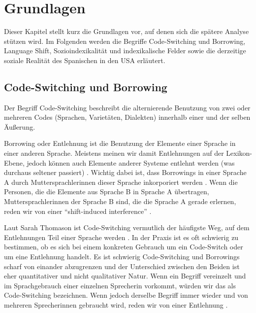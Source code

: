 \section{Grundlagen}


Dieser Kapitel stellt kurz die Grundlagen vor, auf denen sich die spätere Analyse stützen wird.
Im Folgenden werden die Begriffe Code-Switching und Borrowing, Language Shift, %
Sozioindexikalität und indexikalische Felder sowie die derzeitige soziale Realität des Spanischen in den USA erläutert.

\subsection{Code-Switching und Borrowing}
Der Begriff Code-Switching beschreibt die alternierende Benutzung von zwei oder mehreren Codes (Sprachen, Varietäten, Dialekten) innerhalb einer und der selben Äußerung. %

Borrowing oder Entlehnung ist die Benutzung der Elemente einer Sprache in einer anderen Sprache.
Meistens meinen wir damit Entlehnungen auf der Lexikon-Ebene, jedoch können auch Elemente anderer Systeme entlehnt werden (was durchaus seltener passiert) \cite[vgl.][]{Thomason03}.
Wichtig dabei ist, dass Borrowings in einer Sprache A durch Muttersprachlerinnen dieser Sprache inkorporiert werden \cite[vgl.][]{Thomason03}.
Wenn die Personen, die die Elemente aus Sprache B in Sprache A übertragen, Muttersprachlerinnen der Sprache B sind, die die Sprache A gerade erlernen, reden wir von einer ``shift-induced interference'' \cite[vgl.][]{Thomason03}.


Laut Sarah Thomason ist Code-Switching vermutlich der häufigste Weg, auf dem Entlehnungen Teil einer Sprache werden \cite[vgl.][]{Thomason03}.
In der Praxis ist es oft schwierig zu bestimmen, ob es sich bei einem konkreten Gebrauch um ein Code-Switch oder um eine Entlehnung handelt.
Es ist schwierig Code-Switching und Borrowings scharf von einander abzugrenzen und der Unterschied zwischen den Beiden ist eher quantitativer und nicht qualitativer Natur.
Wenn ein Begriff vereinzelt und im Sprachgebrauch einer einzelnen Sprecherin vorkommt, würden wir das als Code-Switching bezeichnen.
Wenn jedoch derselbe Begriff immer wieder und von mehreren Sprecherinnen gebraucht wird, reden wir von einer Entlehnung \cite[vgl.][]{Thomason03}.

